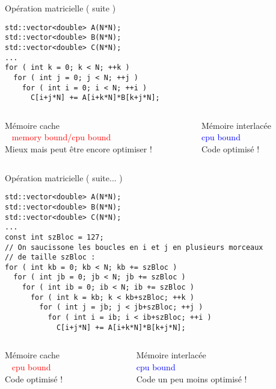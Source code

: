 \documentclass[handout,francais]{beamer}
\begin{document}
\begin{frame}[fragile]{Opération matricielle ( suite )}
 \begin{lstlisting}
std::vector<double> A(N*N);
std::vector<double> B(N*N);
std::vector<double> C(N*N);
...
for ( int k = 0; k < N; ++k )
  for ( int j = 0; j < N; ++j )
    for ( int i = 0; i < N; ++i )
      C[i+j*N] += A[i+k*N]*B[k+j*N];
\end{lstlisting}

 \begin{columns}[t]
  \begin{column}{0.5\textwidth}
   \textcolor{green!25!black}{Mémoire cache} 
   \\ 
   \textcolor{red}{memory bound/cpu bound}
   \\
   Mieux mais peut être encore optimiser !
   \end{column}
   \begin{column}{0.5\textwidth}
   \textcolor{orange!25!black}{Mémoire interlacée}
   \\
   \textcolor{blue}{cpu bound}
   \\
   Code optimisé !
  \end{column}
 \end{columns} 

\end{frame}

\begin{frame}[fragile]{Opération matricielle ( suite... )}

\begin{lstlisting}
std::vector<double> A(N*N);
std::vector<double> B(N*N);
std::vector<double> C(N*N);
...
const int szBloc = 127;
// On saucissone les boucles en i et j en plusieurs morceaux 
// de taille szBloc :
for ( int kb = 0; kb < N; kb += szBloc )
  for ( int jb = 0; jb < N; jb += szBloc )
    for ( int ib = 0; ib < N; ib += szBloc )
      for ( int k = kb; k < kb+szBloc; ++k )
        for ( int j = jb; j < jb+szBloc; ++j )
          for ( int i = ib; i < ib+szBloc; ++i )
            C[i+j*N] += A[i+k*N]*B[k+j*N];
\end{lstlisting}

 \begin{columns}[t]
  \begin{column}{0.5\textwidth}
   \textcolor{green!25!black}{Mémoire cache} 
   \\ 
   \textcolor{red}{cpu bound}
   \\
   Code optimisé !
   \end{column}
   \begin{column}{0.5\textwidth}
   \textcolor{orange!25!black}{Mémoire interlacée}
   \\
   \textcolor{blue}{cpu bound}
   \\
   Code un peu moins optimisé !
  \end{column}
 \end{columns}
\end{frame}
\end{document}
